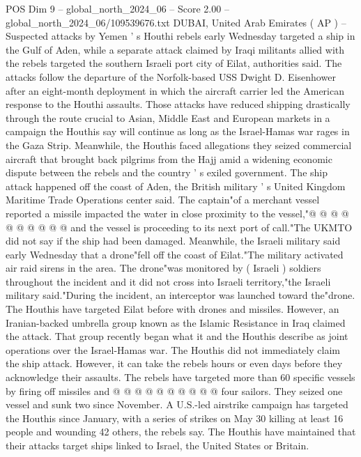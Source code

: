 \begin{textsample}{POS Dim 9 – global\_north\_2024\_06 – Score 2.00 – global\_north\_2024\_06/109539676.txt}  \label{ex:f9_pos_276}
DUBAI, United Arab Emirates ( AP ) -- Suspected attacks by Yemen ' s Houthi rebels early Wednesday targeted a ship in the Gulf of Aden, while a separate attack claimed by Iraqi militants allied with the rebels targeted the southern Israeli port city of Eilat, authorities said.
The attacks follow the departure of the Norfolk-based USS Dwight D.
Eisenhower after an eight-month deployment in which the aircraft carrier led the American response to the Houthi assaults.
Those attacks have reduced shipping drastically through the route crucial to Asian, Middle East and European markets in a campaign the Houthis say will continue as long as the Israel-Hamas war rages in the Gaza Strip.
Meanwhile, the Houthis faced allegations they seized commercial aircraft that brought back pilgrims from the Hajj amid a widening economic dispute between the rebels and the country ' s exiled government.
The ship attack happened off the coast of Aden, the British military ' s United Kingdom Maritime Trade Operations center said.
The captain"of a merchant vessel reported a missile impacted the water in close proximity to the vessel,"@ @ @ @ @ @ @ @ @ @ and the vessel is proceeding to its next port of call."The UKMTO did not say if the ship had been damaged.
Meanwhile, the Israeli military said early Wednesday that a drone"fell off the coast of Eilat."The military activated air raid sirens in the area.
The drone"was monitored by ( Israeli ) soldiers throughout the incident and it did not cross into Israeli territory,"the Israeli military said."During the incident, an interceptor was launched toward the"drone.
The Houthis have targeted Eilat before with drones and missiles.
However, an Iranian-backed umbrella group known as the Islamic Resistance in Iraq claimed the attack.
That group recently began what it and the Houthis describe as joint operations over the Israel-Hamas war.
The Houthis did not immediately claim the ship attack.
However, it can take the rebels hours or even days before they acknowledge their assaults.
The rebels have targeted more than 60 specific vessels by firing off missiles and @ @ @ @ @ @ @ @ @ @ four sailors.
They seized one vessel and sunk two since November.
A U.S.-led airstrike campaign has targeted the Houthis since January, with a series of strikes on May 30 killing at least 16 people and wounding 42 others, the rebels say.
The Houthis have maintained that their attacks target ships linked to Israel, the United States or Britain.

\end{textsample}
